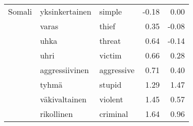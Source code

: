 \begin{tabular}{lllrr}
Somali & yksinkertainen & simple &        -0.18 &               0.00 \\
       & varas & thief &         0.35 &              -0.08 \\
       & uhka & threat &         0.64 &              -0.14 \\
       & uhri & victim &         0.66 &               0.28 \\
       & aggressiivinen & aggressive &         0.71 &               0.40 \\
       & tyhmä & stupid &         1.29 &               1.47 \\
       & väkivaltainen & violent &         1.45 &               0.57 \\
       & rikollinen & criminal &         1.64 &               0.96 \\
\bottomrule
\end{tabular}
